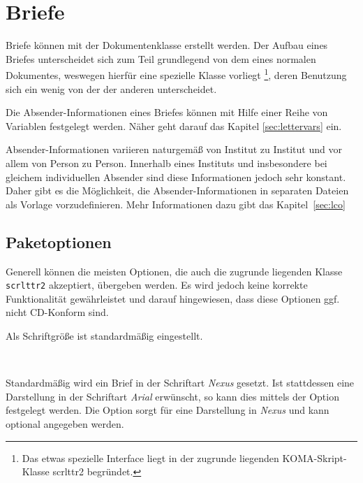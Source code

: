 \chapter{Briefe}

Briefe können mit der Dokumentenklasse  erstellt
werden.
Der Aufbau eines Briefes unterscheidet sich zum Teil grundlegend von dem eines
normalen Dokumentes, weswegen hierfür eine spezielle Klasse vorliegt%
\footnote{Das etwas spezielle Interface liegt in der zugrunde liegenden 
KOMA-Skript-Klasse scrlttr2 begründet.}, deren Benutzung sich ein wenig von
der der anderen unterscheidet.

Die Absender-Informationen eines Briefes können mit Hilfe einer Reihe von
Variablen festgelegt werden. Näher geht darauf das Kapitel \ref{sec:lettervars}
ein.

Absender-Informationen variieren naturgemäß von Institut zu Institut
und vor allem von Person zu Person. Innerhalb eines Instituts und insbesondere
bei gleichem individuellen Absender sind diese Informationen jedoch sehr
konstant. Daher gibt es die Möglichkeit, die Absender-Informationen in
separaten Dateien als Vorlage vorzudefinieren. Mehr Informationen dazu gibt
das Kapitel~\ref{sec:lco}

\section{Paketoptionen}

Generell können die meisten Optionen, die auch die zugrunde liegenden Klasse
\texttt{scrlttr2} akzeptiert, übergeben werden. Es wird jedoch keine korrekte
Funktionalität gewährleistet und darauf hingewiesen, dass diese Optionen
ggf. nicht \acs{CD}-Konform sind.

Als Schriftgröße ist standardmäßig \PValue{10pt} eingestellt.

\begin{Declaration}
  \\
\end{Declaration}

Standardmäßig wird ein Brief in der Schriftart \emph{Nexus} gesetzt.
Ist stattdessen eine Darstellung in der Schriftart \emph{Arial} erwünscht,
so kann dies mittels der Option  festgelegt werden.
Die Option  sorgt für eine Darstellung in \emph{Nexus} und
kann optional angegeben werden.

\begin{Declaration}
\end{Declaration}

